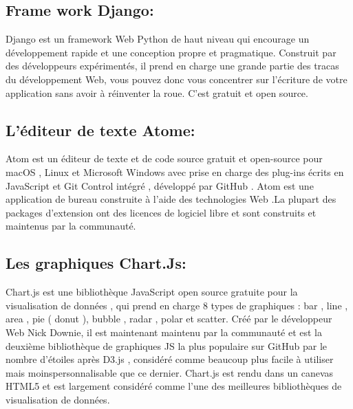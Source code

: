 \documentclass[a4paper]{report}
\begin{document}
\begin{doublespace}
    \newpage

    \subsection{Frame work Django:}
    \begin{figure}[H]
        \raggedleft{
        }
    \end{figure}
    Django est un framework Web Python de haut niveau qui
    encourage un développement rapide et une conception propre et pragmatique.
    Construit par des développeurs expérimentés, il prend en charge une grande
    partie des tracas du développement Web, vous pouvez donc vous concentrer sur
    l'écriture de votre application sans avoir à réinventer la roue. C'est gratuit
    et open source.

    \subsection{L'éditeur de texte Atome:}
    \begin{figure}[H]
        \raggedleft{
        }
    \end{figure}
    Atom est un éditeur de texte et de code source gratuit
    et open-source pour macOS , Linux et Microsoft Windows avec prise en charge des
    plug-ins écrits en JavaScript et Git Control intégré , développé par GitHub .
    Atom est une application de bureau construite à l'aide des technologies Web .La
    plupart des packages d'extension ont des licences de logiciel libre et sont
    construits et maintenus par la communauté.
    \newpage
    \subsection{ Les graphiques Chart.Js:}
    \begin{figure}[H]
        \raggedleft{
        }
    \end{figure}
    Chart.js est une bibliothèque JavaScript open source
    gratuite pour la visualisation de données , qui prend en charge 8 types de
    graphiques : bar , line , area , pie ( donut ), bubble , radar , polar et
    scatter. Créé par le développeur Web  Nick Downie, il est maintenant maintenu
    par la communauté et est la deuxième bibliothèque de graphiques JS la plus
    populaire sur GitHub par le nombre d'étoiles après D3.js , considéré comme
    beaucoup plus facile à utiliser mais moinspersonnalisable que ce dernier.
    Chart.js est rendu dans un canevas HTML5 et est largement considéré comme l'une
    des meilleures bibliothèques de visualisation de données.

\end{doublespace}
\end{document}
